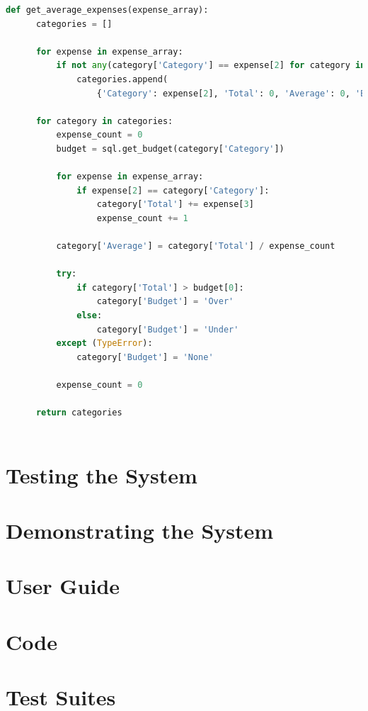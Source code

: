 \documentclass[12pt]{article}
\begin{document}
  \begin{landscape}
    \begin{lstlisting}[language=Python, caption=Source code for \textit{get\_average\_expenses().}, captionpos=b]
      def get_average_expenses(expense_array):
      categories = []

      for expense in expense_array:
          if not any(category['Category'] == expense[2] for category in categories):
              categories.append(
                  {'Category': expense[2], 'Total': 0, 'Average': 0, 'Budget': None})

      for category in categories:
          expense_count = 0
          budget = sql.get_budget(category['Category'])

          for expense in expense_array:
              if expense[2] == category['Category']:
                  category['Total'] += expense[3]
                  expense_count += 1

          category['Average'] = category['Total'] / expense_count

          try:
              if category['Total'] > budget[0]:
                  category['Budget'] = 'Over'
              else:
                  category['Budget'] = 'Under'
          except (TypeError):
              category['Budget'] = 'None'

          expense_count = 0

      return categories
      
    \end{lstlisting}
  \end{landscape}

  \section{Testing the System}
  \section{Demonstrating the System}

  \appendix
  \section{User Guide}
  \section{Code}
  \section{Test Suites}
\end{document}

